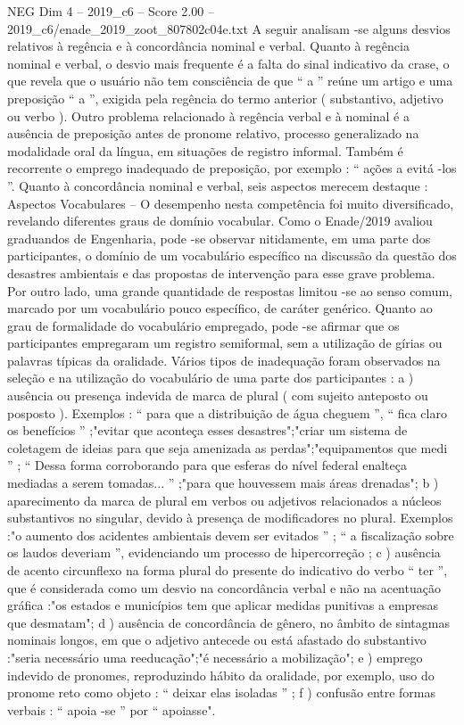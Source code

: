 \begin{textsample}{NEG Dim 4 – 2019\_c6 – Score 2.00 – 2019\_c6/enade\_2019\_zoot\_807802c04e.txt}
A seguir analisam -se alguns desvios relativos à regência e à concordância nominal e verbal.
Quanto à regência nominal e verbal, o desvio mais frequente é a falta do sinal indicativo da crase, o que revela que o usuário não tem consciência de que “ a ” reúne um artigo e uma preposição “ a ”, exigida pela regência do termo anterior ( substantivo, adjetivo ou verbo ).
Outro problema relacionado à regência verbal e à nominal é a ausência de preposição antes de pronome relativo, processo generalizado na modalidade oral da língua, em situações de registro informal.
Também é recorrente o emprego inadequado de preposição, por exemplo : “ ações a evitá -los ”.
Quanto à concordância nominal e verbal, seis aspectos merecem destaque : Aspectos Vocabulares – O desempenho nesta competência foi muito diversificado, revelando diferentes graus de domínio vocabular.
Como o Enade/2019 avaliou graduandos de Engenharia, pode -se observar nitidamente, em uma parte dos participantes, o domínio de um vocabulário específico na discussão da questão dos desastres ambientais e das propostas de intervenção para esse grave problema.
Por outro lado, uma grande quantidade de respostas limitou -se ao senso comum, marcado por um vocabulário pouco específico, de caráter genérico.
Quanto ao grau de formalidade do vocabulário empregado, pode -se afirmar que os participantes empregaram um registro semiformal, sem a utilização de gírias ou palavras típicas da oralidade.
Vários tipos de inadequação foram observados na seleção e na utilização do vocabulário de uma parte dos participantes : a ) ausência ou presença indevida de marca de plural ( com sujeito anteposto ou posposto ).
Exemplos : “ para que a distribuição de água cheguem ”, “ fica claro os benefícios ” ;"evitar que aconteça esses desastres";"criar um sistema de coletagem de ideias para que seja amenizada as perdas";"equipamentos que medi ” ; “ Dessa forma corroborando para que esferas do nível federal enalteça mediadas a serem tomadas... ” ;"para que houvessem mais áreas drenadas"; b ) aparecimento da marca de plural em verbos ou adjetivos relacionados a núcleos substantivos no singular, devido à presença de modificadores no plural.
Exemplos :"o aumento dos acidentes ambientais devem ser evitados ” ; “ a fiscalização sobre os laudos deveriam ”, evidenciando um processo de hipercorreção ; c ) ausência de acento circunflexo na forma plural do presente do indicativo do verbo “ ter ”, que é considerada como um desvio na concordância verbal e não na acentuação gráfica :"os estados e municípios tem que aplicar medidas punitivas a empresas que desmatam"; d ) ausência de concordância de gênero, no âmbito de sintagmas nominais longos, em que o adjetivo antecede ou está afastado do substantivo :"seria necessário uma reeducação";"é necessário a mobilização"; e ) emprego indevido de pronomes, reproduzindo hábito da oralidade, por exemplo, uso do pronome reto como objeto : “ deixar elas isoladas ” ; f ) confusão entre formas verbais : “ apoia -se ” por “ apoiasse".

\end{textsample}
